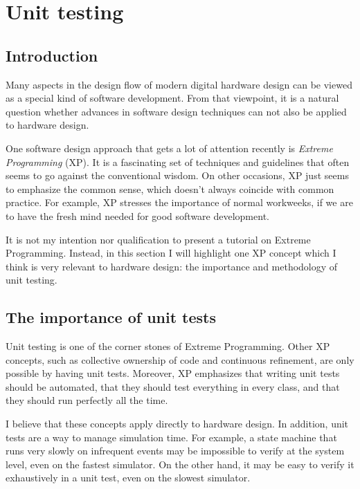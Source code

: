 \chapter{Unit testing \label{unittest}}

\section{Introduction \label{unittest-intro}}

Many aspects in the design flow of modern digital hardware design can
be viewed as a special kind of software development. From that
viewpoint, it is a natural question whether advances in software
design techniques can not also be applied to hardware design.

One software design approach that gets a lot of attention recently is
%
\emph{Extreme Programming} (XP). It is a fascinating set of techniques and
guidelines that often seems to go against the conventional wisdom. On
other occasions, XP just seems to emphasize the common sense, which
doesn't always coincide with common practice. For example, XP stresses
the importance of normal workweeks, if we are to have the
fresh mind needed for good software development.

It is not my intention nor qualification to present a tutorial on
Extreme Programming. Instead, in this section I will highlight one XP
concept which I think is very relevant to hardware design: the
importance and methodology of unit testing.

\section{The importance of unit tests \label{unittest-why}}

Unit testing is one of the corner stones of Extreme Programming. Other
XP concepts, such as collective ownership of code and continuous
refinement, are only possible by having unit tests. Moreover, XP
emphasizes that writing unit tests should be automated, that they should
test everything in every class, and that they should run perfectly all
the time. 

I believe that these concepts apply directly to hardware design. In
addition, unit tests are a way to manage simulation time. For example,
a state machine that runs very slowly on infrequent events may be
impossible to verify at the system level, even on the fastest
simulator. On the other hand, it may be easy to verify it exhaustively
in a unit test, even on the slowest simulator.

